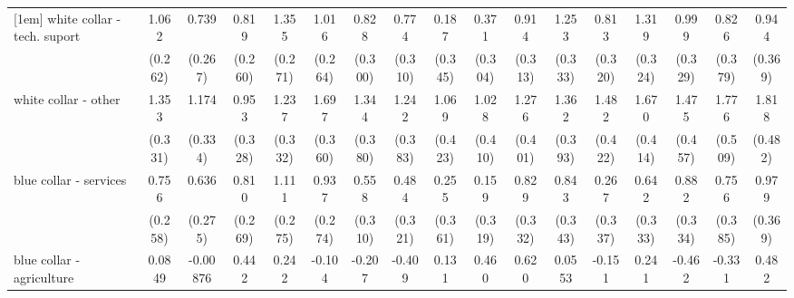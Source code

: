 {\begin{tabular}{l*{16}{c}}
[1em]
white collar - tech. suport&       1.062\sym{***}&       0.739\sym{**} &       0.819\sym{**} &       1.355\sym{***}&       1.016\sym{***}&       0.828\sym{**} &       0.774\sym{*}  &       0.187         &       0.371         &       0.914\sym{**} &       1.253\sym{***}&       0.813\sym{*}  &       1.319\sym{***}&       0.999\sym{**} &       0.826\sym{*}  &       0.944\sym{*}  \\
                    &     (0.262)         &     (0.267)         &     (0.260)         &     (0.271)         &     (0.264)         &     (0.300)         &     (0.310)         &     (0.345)         &     (0.304)         &     (0.313)         &     (0.333)         &     (0.320)         &     (0.324)         &     (0.329)         &     (0.379)         &     (0.369)         \\
[1em]
white collar - other&       1.353\sym{***}&       1.174\sym{***}&       0.953\sym{**} &       1.237\sym{***}&       1.697\sym{***}&       1.344\sym{***}&       1.242\sym{**} &       1.069\sym{*}  &       1.028\sym{*}  &       1.276\sym{**} &       1.362\sym{***}&       1.482\sym{***}&       1.670\sym{***}&       1.475\sym{**} &       1.776\sym{***}&       1.818\sym{***}\\
                    &     (0.331)         &     (0.334)         &     (0.328)         &     (0.332)         &     (0.360)         &     (0.380)         &     (0.383)         &     (0.423)         &     (0.410)         &     (0.401)         &     (0.393)         &     (0.422)         &     (0.414)         &     (0.457)         &     (0.509)         &     (0.482)         \\
[1em]
blue collar - services&       0.756\sym{**} &       0.636\sym{*}  &       0.810\sym{**} &       1.111\sym{***}&       0.937\sym{***}&       0.558         &       0.484         &       0.255         &       0.159         &       0.829\sym{*}  &       0.843\sym{*}  &       0.267         &       0.642         &       0.882\sym{**} &       0.756\sym{*}  &       0.979\sym{**} \\
                    &     (0.258)         &     (0.275)         &     (0.269)         &     (0.275)         &     (0.274)         &     (0.310)         &     (0.321)         &     (0.361)         &     (0.319)         &     (0.332)         &     (0.343)         &     (0.337)         &     (0.333)         &     (0.334)         &     (0.385)         &     (0.369)         \\
[1em]
blue collar - agriculture&      0.0849         &    -0.00876         &       0.442         &       0.242         &      -0.104         &      -0.207         &      -0.409         &       0.131         &       0.460         &       0.620         &      0.0553         &      -0.151         &       0.241         &      -0.462         &      -0.331         &       0.482         \\

\end{tabular}}
